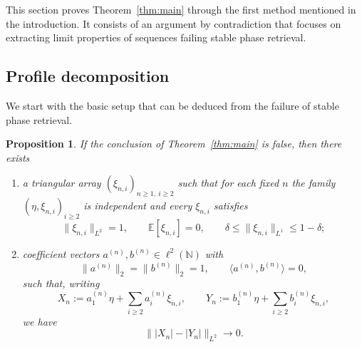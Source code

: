 \documentclass[11pt]{amsart}
\numberwithin{equation}{section}
\newtheorem{proposition}[theorem]{Proposition}
\theoremstyle{definition}
\theoremstyle{remark}
\newcommand{\E}{\mathbb E}
\newcommand{\N}{\mathbb N}
\newcommand{\abs}[1]{\lvert #1 \rvert}
\newcommand{\norm}[1]{\lVert #1 \rVert}
\newcommand{\ip}[2]{\langle #1,#2\rangle}
\begin{document}
This section proves Theorem~\ref{thm:main} through the first method mentioned in the introduction. It consists of an argument by contradiction that focuses on extracting limit properties of sequences failing stable phase retrieval. 

\subsection{Profile decomposition} We start with the basic setup that can be deduced from the failure of stable phase retrieval. 

\begin{proposition}\label{prop:counterexample}
If the conclusion of Theorem~\ref{thm:main} is false, then there exists
\begin{enumerate}[label=\rm(\roman*)]
\item a triangular array $(\xi_{n,i})_{n\ge1,\ i\ge2}$ such that for each
fixed $n$ the family $(\eta,\xi_{n,i})_{i\ge2}$ is independent and every
$\xi_{n,i}$ satisfies
\[
\norm{\xi_{n,i}}_{L^2}=1,
\qquad
\E[\xi_{n,i}]=0,
\qquad
\delta\le \norm{\xi_{n,i}}_{L^1}\le 1-\delta;
\]
\item coefficient vectors $a^{(n)},b^{(n)}\in \ell^2(\N)$ with
\[
\norm{a^{(n)}}_2=\norm{b^{(n)}}_2=1,
\qquad
\ip{a^{(n)}}{b^{(n)}}=0,
\]
such that, writing
\[
X_n:=a_1^{(n)}\eta+\sum_{i\ge2} a_i^{(n)}\xi_{n,i},
\qquad
Y_n:=b_1^{(n)}\eta+\sum_{i\ge2} b_i^{(n)}\xi_{n,i},
\]
we have
\[
\norm{\abs{X_n}-\abs{Y_n}}_{L^2}\longrightarrow 0.
\]
\end{enumerate}
\end{proposition}
\end{document}
